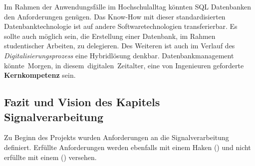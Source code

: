 Im Rahmen der Anwendungsfälle im Hochschulalltag könnten SQL Datenbanken den Anforderungen genügen. Das Know-How mit dieser standardisierten Datenbanktechnologie ist auf andere Softwaretechnologien transferierbar.  Es sollte auch möglich sein, die Erstellung einer Datenbank, im Rahmen studentischer Arbeiten, zu delegieren. Des Weiteren ist auch im Verlauf des \textit{Digitalisierungsprozess} eine Hybridlösung denkbar. Datenbankmanagement könnte \,{\Menlo Morgen}, in diesem \,{\Menlo digitalen} \,{\Menlo Zeitalter}, eine von Ingenieuren geforderte \textbf{{\Hypatia Kernkompetenz}} sein.

\FloatBarrier 
\pagebreak
\subsection{Fazit und Vision des Kapitels Signalverarbeitung}

Zu Beginn des Projekts wurden Anforderungen an die Signalverarbeitung definiert. Erfüllte Anforderungen werden ebenfalls mit einem Haken (\cmark) und nicht erfüllte mit einem (\xmark) versehen.

